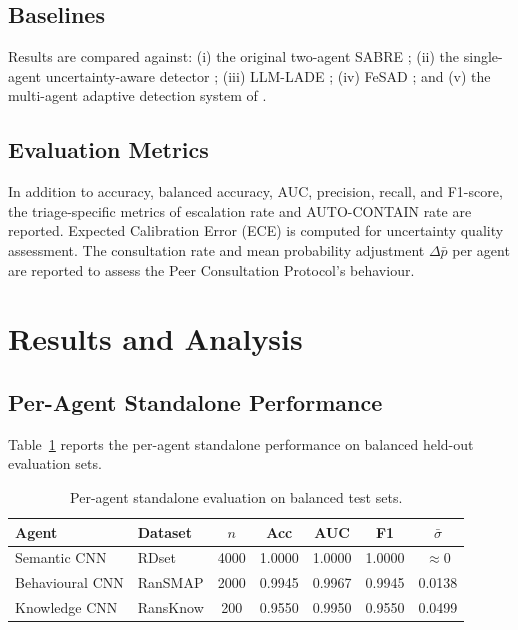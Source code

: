 \subsection{Baselines}

Results are compared against: (i) the original two-agent SABRE \cite{kabuye2026sabre}; (ii) the single-agent uncertainty-aware detector \cite{kabuye2025explainable}; (iii) LLM-LADE \cite{ZhangLZYHY25}; (iv) FeSAD \cite{Fernando2024FeSAD}; and (v) the multi-agent adaptive detection system of \cite{MultiAgentAdaptiveDetection2023}.

\subsection{Evaluation Metrics}

In addition to accuracy, balanced accuracy, AUC, precision, recall, and F1-score, the triage-specific metrics of escalation rate and AUTO-CONTAIN rate are reported. Expected Calibration Error (ECE) is computed for uncertainty quality assessment. The consultation rate and mean probability adjustment $\Delta\bar{p}$ per agent are reported to assess the Peer Consultation Protocol's behaviour.


\section{Results and Analysis}
\label{sec:tifs_results}

\subsection{Per-Agent Standalone Performance}

Table~\ref{tab:tifs_agents} reports the per-agent standalone performance on balanced held-out evaluation sets.

\begin{table}[h]
\centering
\caption{Per-agent standalone evaluation on balanced test sets.}
\label{tab:tifs_agents}
\begin{tabular}{llccccc}
\toprule
\textbf{Agent} & \textbf{Dataset} & $n$ & \textbf{Acc} & \textbf{AUC} & \textbf{F1} & $\bar{\sigma}$ \\
\midrule
Semantic CNN   & RDset    & 4000 & 1.0000 & 1.0000 & 1.0000 & $\approx 0$ \\
Behavioural CNN & RanSMAP & 2000 & 0.9945 & 0.9967 & 0.9945 & 0.0138 \\
Knowledge CNN  & RansKnow & 200  & 0.9550 & 0.9950 & 0.9550 & 0.0499 \\
\bottomrule
\end{tabular}
\end{table}

